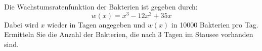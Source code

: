 \begin{exercise}
\begin{enumerate}[a)]
            Die Wachstumsratenfunktion der Bakterien ist gegeben durch:
            \begin{equation*}
              w(x)=x^3-12x^2+35x
            \end{equation*}
            Dabei wird $x$ wieder in Tagen angegeben und $w(x)$ in \num{10000} Bakterien pro Tag.
            Ermitteln Sie die Anzahl der Bakterien, die nach 3 Tagen im Stausee vorhanden sind.
    \end{enumerate}
  \fi
\end{exercise}
